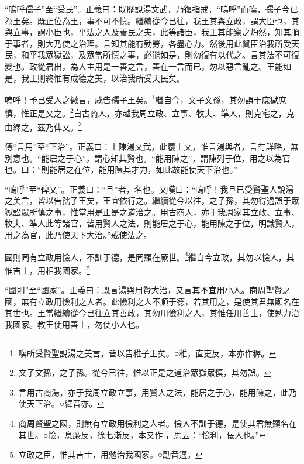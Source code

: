 {\noindent\shu{}\fzkt “嗚呼孺子”至“受民”。正義曰：既歷說湯文武，乃復指戒，“嗚呼”而嘆，孺子今已為王矣。既正位為王，事不可不慎。繼續從今已往，我王其與立政，謂大臣也，其與立事，謂小臣也，平法之人及養民之夫，此等諸臣，我王其能察之灼然，知其順于事者，則大乃使之治理。言知其能有勤勞，各盡心力。然後用此賢臣治我所受天民，和平我眾獄訟，及眾當所慎之事，必能如是，則勿復有以代之。言其法不可復變也。政從君出，為人主用是一善之言，善在一言而已，勿以惡言亂之。王能如是，我王則終惟有成德之美，以治我所受天民矣。 \par}

嗚呼！予已受人之徽言，咸告孺子王矣。\footnote{嘆所受賢聖說湯之美言，皆以告稚子王矣。○稚，直吏反，本亦作稺。}繼自今，文子文孫，其勿誤于庶獄庶慎，惟正是乂之。\footnote{文子文孫，之子孫。從今已往，惟以正是之道治眾獄眾慎，其勿誤。}自古商人，亦越我周立政、立事、牧夫、準人，則克宅之，克由繹之，茲乃俾乂。\footnote{言用古商湯，亦于我周立政立事，用賢人之法，能居之于心，能用陳之，此乃使天下治。○繹音亦。}


{\noindent\zhuan{}\fzbyks 傳“言用”至“下治”。正義曰：上陳湯文武，此覆上文，惟言湯與者，言有詳略，無別意也。“能居之于心”，謂心知其賢也。“能用陳之”，謂陳列于位，用之以為官也。曰：“則能居之在位，能用陳其才力，如此故能使天下治也。” \par}

{\noindent\shu{}\fzkt “嗚呼”至“俾乂”。正義曰：“旦”者，名也。又嘆曰：“嗚呼！我旦已受賢聖人說湯之美言，皆以告孺子王矣，王宜依行之。繼續從今以往，之子孫，其勿得過誤于眾獄訟眾所慎之事，惟當用是正是之道治之。用古商人，亦于我周家其立政、立事、牧夫、準人此等諸官，皆用賢人之法，則能居之于心，能用陳之于位，明識賢人，用之為官，此乃使天下大治。”戒使法之。 \par}

國則罔有立政用憸人，不訓于德，是罔顯在厥世。\footnote{商周賢聖之國，則無有立政用憸利之人者。憸人不訓于德，是使其君無顯名在其世。○憸，息廉反，徐七漸反，本又作 ，馬云：“憸利，佞人也。”}繼自今立政，其勿以憸人，其惟吉士，用相我國家。\footnote{立政之臣，惟其吉士，用勉治我國家。○勱音邁。}

{\noindent\shu{}\fzkt “國則”至“國家”。正義曰：既言湯與用賢大治，又言其不宜用小人。商周聖賢之國，無有立政用憸利之人者。此憸利之人不順于德，若其用之，是使其君無顯名在其世也。王當繼續從今已往立其善政，其勿用憸利之人，其惟任用善士，使勉力治我國家。教王使用善士，勿使小人也。 \par}

